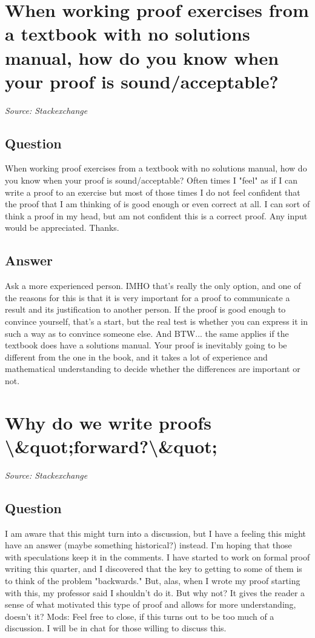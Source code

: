 \documentclass{article}
\begin{document}
\newpage

\section{When working proof exercises from a textbook with no solutions manual, how do you know when your proof is sound/acceptable?}
\textit{Source: Stackexchange}

\subsection*{Question}
When working proof exercises from a textbook with no solutions manual, how do you know when your proof is sound/acceptable? Often times I "feel" as if I can write a proof to an exercise but most of those times I do not feel confident that the proof that I am thinking of is good enough or even correct at all. I can sort of think a proof in my head, but am not confident this is a correct proof. Any input would be appreciated. Thanks.

\subsection*{Answer}
Ask a more experienced person. IMHO that's really the only option, and one of the reasons for this is that it is very important for a proof to communicate a result and its justification to another person. If the proof is good enough to convince yourself, that's a start, but the real test is whether you can express it in such a way as to convince someone else. And BTW... the same applies if the textbook does have a solutions manual. Your proof is inevitably going to be different from the one in the book, and it takes a lot of experience and mathematical understanding to decide whether the differences are important or not.

\newpage

\section{Why do we write proofs \textbackslash{}&quot;forward?\textbackslash{}&quot;}
\textit{Source: Stackexchange}

\subsection*{Question}
I am aware that this might turn into a discussion, but I have a feeling this might have an answer (maybe something historical?) instead. I'm hoping that those with speculations keep it in the comments. I have started to work on formal proof writing this quarter, and I discovered that the key to getting to some of them is to think of the problem "backwards." But, alas, when I wrote my proof starting with this, my professor said I shouldn't do it. But why not? It gives the reader a sense of what motivated this type of proof and allows for more understanding, doesn't it? Mods: Feel free to close, if this turns out to be too much of a discussion. I will be in chat for those willing to discuss this.
\end{document}
